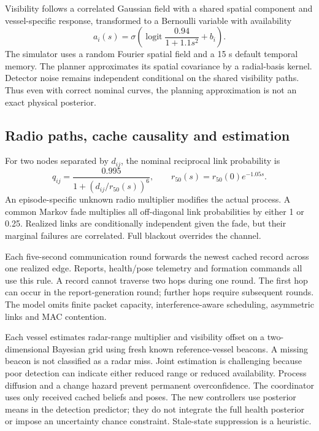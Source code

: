 Visibility follows a correlated Gaussian field with a shared spatial component
and vessel-specific response, transformed to a Bernoulli variable with
availability
\begin{equation}
 a_i(s)=\sigma\!\left(\operatorname{logit}
 \frac{0.94}{1+1.1s^2}+b_i\right).
\end{equation}
The simulator uses a random Fourier spatial field and a 15 s default temporal
memory. The planner approximates its spatial covariance by a radial-basis kernel.
Detector noise remains independent conditional on the shared visibility paths.
Thus even with correct nominal curves, the planning approximation is not an
exact physical posterior.

\subsection{Radio paths, cache causality and estimation}
For two nodes separated by $d_{ij}$, the nominal reciprocal link probability is
\begin{equation}
 q_{ij}=\frac{0.995}{1+(d_{ij}/r_{50}(s))^6},\qquad
 r_{50}(s)=r_{50}(0)e^{-1.05s}.\label{eq:q}
\end{equation}
An episode-specific unknown radio multiplier modifies the actual process.
A common Markov fade multiplies all off-diagonal link probabilities by either
1 or 0.25. Realized links are conditionally independent given the fade, but
their marginal failures are correlated. Full blackout overrides the channel.

Each five-second communication round forwards the newest cached record across
one realized edge. Reports, health/pose telemetry and formation commands all
use this rule. A record cannot traverse two hops during one round.
The first hop can occur in the report-generation round; further hops require
subsequent rounds. The model omits finite packet capacity, interference-aware
scheduling, asymmetric links and MAC contention.

Each vessel estimates radar-range multiplier and visibility offset on a
two-dimensional Bayesian grid using fresh known reference-vessel beacons.
A missing beacon is not classified as a radar miss. Joint estimation is
challenging because poor detection can indicate either reduced range or
reduced availability. Process diffusion and a change hazard prevent permanent
overconfidence. The coordinator uses only received cached beliefs and poses.
The new controllers use posterior means in the detection predictor; they do
not integrate the full health posterior or impose an uncertainty chance
constraint. Stale-state suppression is a heuristic.

